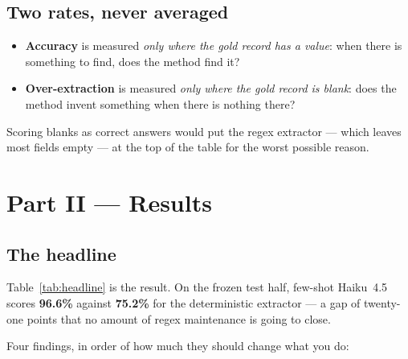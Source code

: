 \documentclass[11pt]{article}
\begin{document}
\subsection{Two rates, never averaged}
\label{sec:tworates}

\begin{itemize}
\item \textbf{Accuracy} is measured \emph{only where the gold record has a value}: when there
is something to find, does the method find it?
\item \textbf{Over-extraction} is measured \emph{only where the gold record is blank}: does
the method invent something when there is nothing there?
\end{itemize}

Scoring blanks as correct answers would put the regex extractor --- which leaves most fields
empty --- at the top of the table for the worst possible reason.

\section{Part II --- Results}



\subsection{The headline}

Table~\ref{tab:headline} is the result. On the frozen test half, few-shot Haiku~4.5 scores
\textbf{96.6\%} against \textbf{75.2\%} for the deterministic extractor --- a gap of twenty-one
points that no amount of regex maintenance is going to close.

Four findings, in order of how much they should change what you do:
\end{document}
